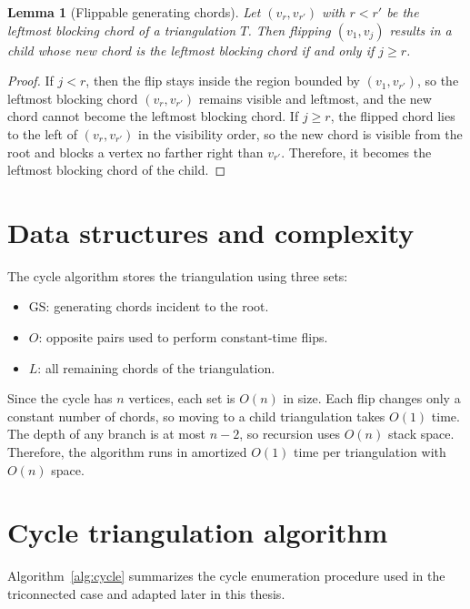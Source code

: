 \documentclass[12pt,a4paper]{report}
\newtheorem{lemma}[theorem]{Lemma}
\theoremstyle{definition}
\theoremstyle{remark}
\newcommand{\GS}{\mathrm{GS}}
\begin{document}
\begin{lemma}[Flippable generating chords]
Let $(v_r,v_{r'})$ with $r < r'$ be the leftmost blocking chord of a triangulation $T$.
Then flipping $(v_1,v_j)$ results in a child whose new chord is the leftmost blocking
chord if and only if $j \ge r$.
\end{lemma}

\begin{proof}
If $j < r$, then the flip stays inside the region bounded by $(v_1,v_{r'})$, so the
leftmost blocking chord $(v_r,v_{r'})$ remains visible and leftmost, and the new chord
cannot become the leftmost blocking chord. If $j \ge r$, the flipped chord lies to the
left of $(v_r,v_{r'})$ in the visibility order, so the new chord is visible from the root
and blocks a vertex no farther right than $v_{r'}$. Therefore, it becomes the leftmost
blocking chord of the child.
\end{proof}

\section{Data structures and complexity}

The cycle algorithm stores the triangulation using three sets:
\begin{itemize}[leftmargin=2em]
    \item $\GS$: generating chords incident to the root.
    \item $O$: opposite pairs used to perform constant-time flips.
    \item $L$: all remaining chords of the triangulation.
\end{itemize}
Since the cycle has $n$ vertices, each set is $O(n)$ in size. Each flip changes only a
constant number of chords, so moving to a child triangulation takes $O(1)$ time. The
depth of any branch is at most $n-2$, so recursion uses $O(n)$ stack space. Therefore,
the algorithm runs in amortized $O(1)$ time per triangulation with $O(n)$ space.

\section{Cycle triangulation algorithm}

Algorithm~\ref{alg:cycle} summarizes the cycle enumeration procedure used in the
triconnected case and adapted later in this thesis.
\end{document}
